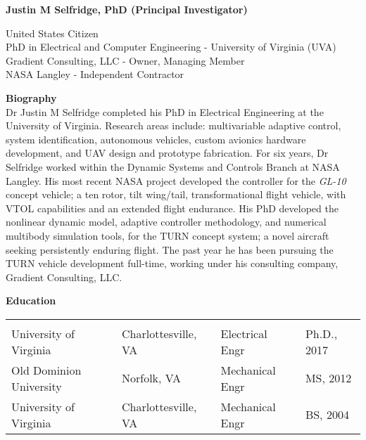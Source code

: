 \documentclass[11pt]{article}
\begin{document}
\vspace{0.2cm}
{\bf \Large Justin M Selfridge, PhD (Principal Investigator)}

United States Citizen \\
PhD in Electrical and Computer 
Engineering - University of Virginia (UVA) \\
Gradient Consulting, LLC - Owner, Managing Member \\
NASA Langley - Independent Contractor


{\bf Biography} \\
Dr Justin M Selfridge completed his PhD in Electrical Engineering at the University of Virginia.  Research areas include: multivariable adaptive control, system identification, autonomous vehicles, custom avionics hardware development, and UAV design and prototype fabrication.  For six years, Dr Selfridge worked within the Dynamic Systems and Controls Branch at NASA Langley.  His most recent NASA project developed the controller for the \emph{GL-10} concept vehicle; a ten rotor, tilt wing/tail, transformational flight vehicle, with VTOL capabilities and an extended flight endurance.  His PhD developed the nonlinear dynamic model, adaptive controller methodology, and numerical multibody simulation tools, for the TURN concept system; a novel aircraft seeking persistently enduring flight.  The past year he has been pursuing the TURN vehicle development full-time, working under his consulting company, Gradient Consulting, LLC.


{\bf Education} \\
\begin{tabular}{llll}
\vspace{-0.15in}
\hspace{2.2in} &
\hspace{1.3in} &
\hspace{1.3in} &
\hspace{0.0in} \\
University of Virginia &
Charlottesville, VA &
Electrical Engr &
Ph.D., 2017 \\
Old Dominion University &
Norfolk, VA &
Mechanical Engr &
MS, 2012 \\
University of Virginia &
Charlottesville, VA &
Mechanical Engr &
BS, 2004
\end{tabular}
\end{document}
